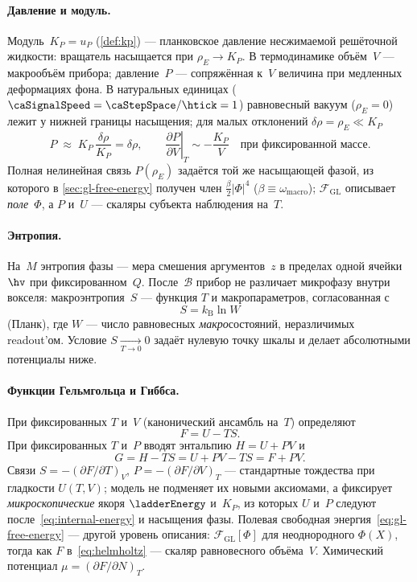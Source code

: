 \paragraph{Давление и модуль.}
Модуль~$K_P=u_P$ (\cref{def:kp}) --- планковское давление несжимаемой решёточной жидкости:
вращатель насыщается при $\rho_E\to K_P$.
В термодинамике объём~$V$ --- макрообъём прибора; давление~$P$ --- сопряжённая
к~$V$ величина при медленных деформациях фона.
В натуральных единицах ($\caSignalSpeed=\caStepSpace/\htick=1$) равновесный вакуум ($\rho_E=0$)
лежит у нижней границы насыщения; для малых отклонений $\delta\rho=\rho_E\ll K_P$
\begin{equation}
\label{eq:pressure-linear}
  P \;\approx\; K_P\,\frac{\delta\rho}{K_P} = \delta\rho,
  \qquad
  \left.\frac{\partial P}{\partial V}\right|_{T}
  \sim -\frac{K_P}{V}\quad\text{при фиксированной массе.}
\end{equation}
Полная нелинейная связь $P(\rho_E)$ задаётся той же насыщающей фазой,
из которого в \cref{sec:gl-free-energy} получен член $\tfrac{\beta}{2}|\Phi|^4$
($\beta\equiv\omega_{\mathrm{macro}}$);
$\mathcal{F}_{\mathrm{GL}}$ описывает \emph{поле}~$\Phi$, а $P$ и~$U$ --- скаляры
субъекта наблюдения на~$T$.

\paragraph{Энтропия.}
На~$M$ энтропия фазы --- мера смешения аргументов~$z$
в пределах одной ячейки~$\hv$ при фиксированном~$Q$.
После~$\mathcal{B}$ прибор не различает микрофазу внутри вокселя:
макроэнтропия~$S$ --- функция $T$ и макропараметров, согласованная с
\[
  S = k_{\mathrm{B}}\ln W
\]
(Планк), где $W$ --- число равновесных \emph{макро}состояний, неразличимых readout'ом.
Условие $S\xrightarrow[T\to 0]{}0$ задаёт нулевую точку шкалы и делает
абсолютными потенциалы ниже.

\paragraph{Функции Гельмгольца и Гиббса.}
При фиксированных $T$ и~$V$ (канонический ансамбль на~$T$) определяют
\begin{equation}
\label{eq:helmholtz}
  F = U - TS.
\end{equation}
При фиксированных $T$ и~$P$ вводят энтальпию $H=U+PV$ и
\begin{equation}
\label{eq:gibbs}
  G = H - TS = U + PV - TS = F + PV.
\end{equation}
Связи $S=-(\partial F/\partial T)_V$, $P=-(\partial F/\partial V)_T$ --- стандартные
тождества при гладкости $U(T,V)$; модель не подменяет их новыми аксиомами,
а фиксирует \emph{микроскопические} якоря $\ladderEnergy$ и~$K_P$, из которых $U$ и~$P$
следуют после~\eqref{eq:internal-energy} и насыщения фазы.
Полевая свободная энергия~\eqref{eq:gl-free-energy} --- другой уровень описания:
$\mathcal{F}_{\mathrm{GL}}[\Phi]$ для неоднородного $\Phi(X)$, тогда как $F$ в~\eqref{eq:helmholtz}
--- скаляр равновесного объёма~$V$.
Химический потенциал $\mu=(\partial F/\partial N)_T$.

